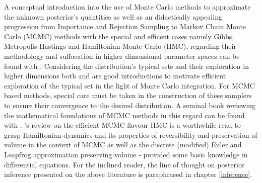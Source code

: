 \documentclass[11pt]{article}
\begin{document}
    A conceptual introduction into the use of Monte Carlo methods to approximate the unknown posterior's quantities as well as an didactically appealing progression from Importance and Rejection Sampling to Markov Chain Monte Carlo (MCMC) methods with the special and efficent cases namely Gibbs, Metropolis-Hastings and Hamiltonian Monte Carlo (HMC), regarding their methodology and suffocation in higher dimensional parameter spaces can be found with \citep{mackay2003information}.
    Considering the distribution's typical sets and their exploration in higher dimensions both \citep{mackay2003information} and \citep{betancourt2017conceptual} are good introductions to motivate efficient exploration of the typical set in the light of Monte Carlo integration.
    For MCMC based methods, special care must be taken in the construction of these samplers to ensure their convergence to the desired distribution. A seminal book reviewing the  mathematical foundations of MCMC methods in this regard can be found with \citep{brooks2011handbook}.
    \citep{neal2011mcmc}'s review on the efficient MCMC flavour HMC is a worthwhile read to grasp Hamiltonian dynamics and its properties of reversibility and preservation of volume in the context of MCMC as well as the discrete (modified) Euler and Leapfrog approximation preserving volume - provided some basic knowledge in differential equations. For the inclined reader, the line of thought on posterior inference presented on the above literature is paraphrased in chapter \ref{inference}.
\end{document}
